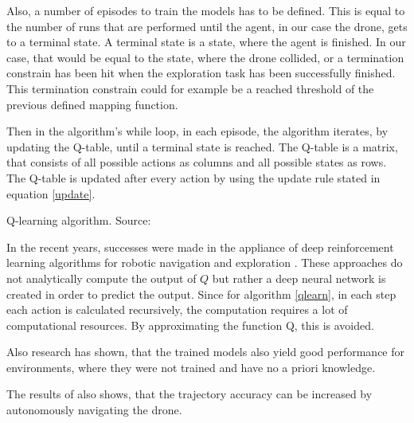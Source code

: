 \begin{enumerate}
	Also, a number of episodes to train the models has to be defined. This is equal to the number of runs that are 
    performed until the agent, in our case the drone, gets to a terminal state. A terminal state is a state, where the agent is finished. In our case, that would 
	be equal to the state, where the drone collided, or a termination constrain has been hit when the exploration task has been successfully finished.
	This termination constrain could for example be a reached 
	threshold of the previous defined mapping function. 
	
	Then in the algorithm's while loop, in each episode, the algorithm iterates, by updating the Q-table, until 
	a terminal state is reached. 
	The Q-table is a matrix, that consists of all possible actions as columns and all possible states as rows. The Q-table is updated after every action by 
	using the update rule stated in equation \ref{update}. 
	
	
	\begin{algorithm}[H]
	\KwData{Parameters: $\alpha \in (0,1], \gamma \in (0,1],$ \ Initialize Q-table with arbitrary Q-values }
	\caption{Q-learning algorithm. Source: \cite{deep}}\label{qlearn}
	\end{algorithm}
	
	
	In the recent years, successes were made in the appliance of deep reinforcement learning algorithms for robotic navigation and exploration \cite{deep} \cite{accurat}. 
	These approaches do not analytically compute the output of $Q$ but rather a deep neural network is created in order to predict the output. 
	Since for algorithm \ref{qlearn}, in each step each action is calculated recursively, the computation requires a lot of computational resources. By approximating the function Q, this is avoided. 
	
	Also research has shown, that the trained models also yield good performance for environments, where they were not trained and have no a priori knowledge. 

	
	The results of \cite{deep} also shows, that the trajectory accuracy can be increased by autonomously navigating the drone. 
	\begin{quote}
	

\end{quote}
\end{enumerate}
